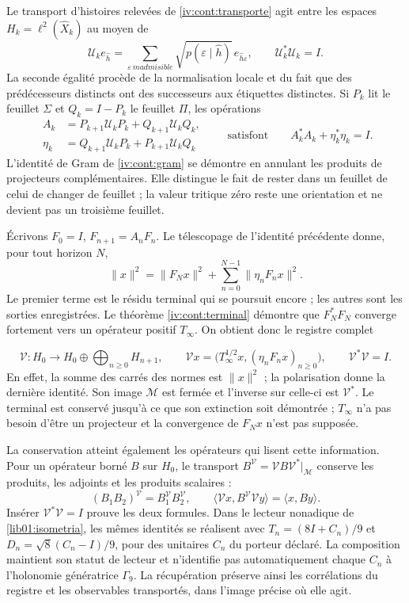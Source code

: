 Le transport d'histoires relevées de \cref{iv:cont:transporte} agit entre les espaces \(H_k=\ell^2(\widehat X_k)\) au moyen de
\[
 \mathcal U_ke_{\widehat h}=
 \sum_{\varepsilon\ {
m admisible}}
 \sqrt{p(\varepsilon\mid\widehat h)}\,
 e_{\widehat h\varepsilon},\qquad
 \mathcal U_k^*\mathcal U_k=I.
\]
La seconde égalité procède de la normalisation locale et du fait que des prédécesseurs
distincts ont des successeurs aux étiquettes distinctes. Si \(P_k\) lit le feuillet
\(\Sigma\) et \(Q_k=I-P_k\) le feuillet \(\Pi\), les opérations
\[
 \begin{aligned}
 A_k&=P_{k+1}\mathcal U_kP_k+Q_{k+1}\mathcal U_kQ_k,\\
 \eta_k&=Q_{k+1}\mathcal U_kP_k+P_{k+1}\mathcal U_kQ_k
 \end{aligned}
 \qquad\text{satisfont}\qquad A_k^*A_k+\eta_k^*\eta_k=I.
\]
L'identité de Gram de \cref{iv:cont:gram} se démontre en annulant les produits de projecteurs complémentaires. Elle distingue le fait de rester dans un feuillet de celui de changer de feuillet ; la valeur tritique zéro reste une orientation et ne devient pas un troisième feuillet.

Écrivons \(F_0=I\), \(F_{n+1}=A_nF_n\). Le télescopage de
l’identité précédente donne, pour tout horizon \(N\),
\[
 \|x\|^2=\|F_Nx\|^2+
                 \sum_{n=0}^{N-1}\|\eta_nF_nx\|^2.
\]
Le premier terme est le résidu terminal qui se poursuit encore ; les autres
sont les sorties enregistrées. Le théorème \cref{iv:cont:terminal} démontre
que \(F_N^*F_N\) converge fortement vers un opérateur positif
\(T_\infty\). On obtient donc le registre complet

\[
 \mathcal V:H_0\longrightarrow H_0\oplus
                     \bigoplus_{n\geq0}H_{n+1},\qquad
 \mathcal Vx=\bigl(T_\infty^{1/2}x,
                         (\eta_nF_nx)_{n\geq0}\bigr),
 \qquad\mathcal V^*\mathcal V=I.
\]
En effet, la somme des carrés des normes est \(\|x\|^2\) ; la polarisation donne la dernière identité. Son image \(\mathcal M\) est fermée et l'inverse sur celle-ci est \(\mathcal V^*\). Le terminal est conservé jusqu'à ce que son extinction soit démontrée ; \(T_\infty\) n'a pas besoin d'être un projecteur et la convergence de \(F_Nx\) n'est pas supposée.

La conservation atteint également les opérateurs qui lisent cette information.
Pour un opérateur borné \(B\) sur \(H_0\), le transport
\(B^{\mathcal V}=\mathcal VB\mathcal V^*|_{\mathcal M}\) conserve
les produits, les adjoints et les produits scalaires :
\[
 (B_1B_2)^{\mathcal V}=B_1^{\mathcal V}B_2^{\mathcal V},\qquad
 \langle\mathcal Vx,B^{\mathcal V}\mathcal Vy\rangle
                       =\langle x,By\rangle.
\]
Insérer \(\mathcal V^*\mathcal V=I\) prouve les deux formules. Dans le
lecteur nonadique de \cref{lib01:isometria}, les mêmes identités se
réalisent avec \(T_n=(8I+C_n)/9\) et
\(D_n=\sqrt8(C_n-I)/9\), pour des unitaires \(C_n\) du porteur
déclaré. La composition maintient son statut de lecteur et n’identifie pas
automatiquement chaque \(C_n\) à l’holonomie génératrice \(\Gamma_9\).
La récupération préserve ainsi les corrélations du registre et les
observables transportés, dans l’image précise où elle agit.

